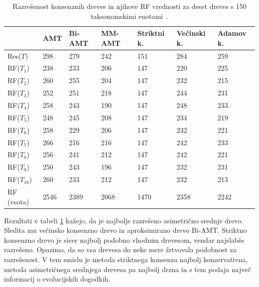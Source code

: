 \documentclass[a4paper, 12pt]{book}
\begin{document}
\begin{table}[h!]
	\begin{center}
	{\footnotesize
	\begin{tabular}{ l| l | l | l | l | l | l }
	
	~            & AMT  & Bi-AMT & MM-AMT  & Striktni k. & Večinski k. & Adamov k. \\ \hline
	Res($T$)     & 298  & 279    & 242     & 151         & 284         & 259       \\ \hline
	RF($T_1$)    & 238  & 233    & 206     & 147         & 220         & 225       \\ \hline
	RF($T_2$)    & 260  & 255    & 204     & 147         & 232         & 215       \\ \hline
	RF($T_3$)    & 252  & 251    & 218     & 147         & 244         & 231       \\ \hline
	RF($T_4$)    & 258  & 243    & 190     & 147         & 248         & 233       \\ \hline
	RF($T_5$)    & 248  & 245    & 208     & 147         & 234         & 219       \\ \hline
	RF($T_6$)    & 258  & 229    & 206     & 147         & 232         & 221       \\ \hline
	RF($T_7$)    & 266  & 216    & 216     & 147         & 242         & 233       \\ \hline
	RF($T_8$)    & 256  & 241    & 212     & 147         & 242         & 221       \\ \hline
	RF($T_9$)    & 250  & 243    & 196     & 147         & 232         & 231       \\ \hline
	RF($T_{10}$) & 260  & 233    & 212     & 147         & 232         & 213       \\ \hline
	RF (vsota)   & 2546 & 2389   & 2068    & 1470        & 2358        & 2242      \\ \hline
	\end{tabular}
	\label{table-eval-alge}
	\caption{Razrešenost konsenznih dreves in njihove RF vrednosti za deset dreves s 150 taksonomskimi enotami~\cite{taxa150}.}
	}
	\end{center}		
\end{table}

Rezultati v tabeli \ref{table-eval-alge} kažejo, da je najbolje razrešeno asimetrično srednje drevo. Sledita mu večinsko konsenzno
drevo in aproksimirano drevo Bi-AMT. Striktno konsenzno drevo je sicer najbolj podobno vhodnim drevesom, vendar najslabše razrešeno.
Opazimo, da so vsa drevesa do neke mere žrtvovala podobnost za razrešenost. V tem smislu je metoda striktnega konsenza najbolj
konzervativna, metoda asimetričnega srednjega drevesa pa najbolj drzna in s tem podaja največ informacij o evolucijskih dogodkih. 
\end{document}
